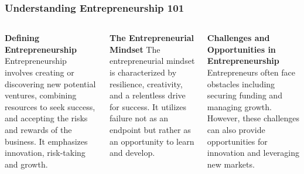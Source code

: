 \documentclass[5pt]{beamer}
\begin{document}
\begin{frame}
\frametitle{Understanding Entrepreneurship 101}
\begin{columns}
\begin{column}{0.3\textwidth}
\begin{block}{\textbf{Defining Entrepreneurship}}
Entrepreneurship involves creating or discovering new potential ventures, combining resources to seek success, and accepting the risks and rewards of the business. It emphasizes innovation, risk-taking and growth.
\end{block}
\end{column}
\begin{column}{0.3\textwidth}
\begin{block}{\textbf{The Entrepreneurial Mindset}}
The entrepreneurial mindset is characterized by resilience, creativity, and a relentless drive for success. It utilizes failure not as an endpoint but rather as an opportunity to learn and develop.
\end{block}
\end{column}
\begin{column}{0.3\textwidth}
\begin{block}{\textbf{Challenges and Opportunities in Entrepreneurship}}
Entrepreneurs often face obstacles including securing funding and managing growth. However, these challenges can also provide opportunities for innovation and leveraging new markets.
\end{block}
\end{column}
\end{columns}
\end{frame}
\end{document}
